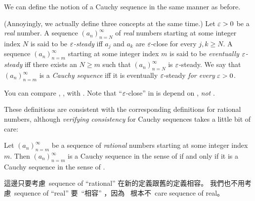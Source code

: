 We can define the notion of a Cauchy sequence in the same manner as before.

\begin{definition}  \label{def 6.1.3}
(Annoyingly, we actually define three concepts at the same time.)
Let \(\varepsilon > 0\) be a \emph{real} number.
A sequence \((a_n)_{n = N}^{\infty}\) of \emph{real} numbers starting at some integer index \(N\) is said to be \emph{\(\varepsilon\)-steady} iff \(a_j\) and \(a_k\) are \(\varepsilon\)-close for every \(j, k \ge N\).
A sequence \((a_n)_{n = m}^{\infty}\) starting at some integer index \(m\) is said to be \emph{eventually \(\varepsilon\)-steady} iff there exists an \(N \ge m\) such that \((a_n)_{n = N}^{\infty}\) is \(\varepsilon\)-steady.
We say that \((a_n)_{n = m}^{\infty}\) is a \emph{Cauchy sequence} iff it is eventually \(\varepsilon\)-steady \emph{for every} \(\varepsilon > 0\).
\end{definition}

\begin{note}
You can compare , ,  with .
Note that ``\(\varepsilon\)-close'' in  is depend on , \emph{not} .

These definitions are consistent with the corresponding definitions for rational numbers, although \emph{verifying consistency} for Cauchy sequences takes a little bit of care:
\end{note}

\begin{proposition} \label{prop 6.1.4}
Let \((a_n)_{n = m}^{\infty}\) be a sequence of \emph{rational} numbers starting at some integer index \(m\).
Then \((a_n)_{n = m}^{\infty}\) is a Cauchy sequence in the sense of  if and only if it is a Cauchy sequence in the sense of .
\end{proposition}

\begin{note}
這邊只要考慮\ sequence of ``rational'' 在新的定義跟舊的定義相容。 我們也不用考慮\ sequence of ``real'' 要\ ``相容'' ，因為\  根本不\ care sequence of real。
\end{note}

